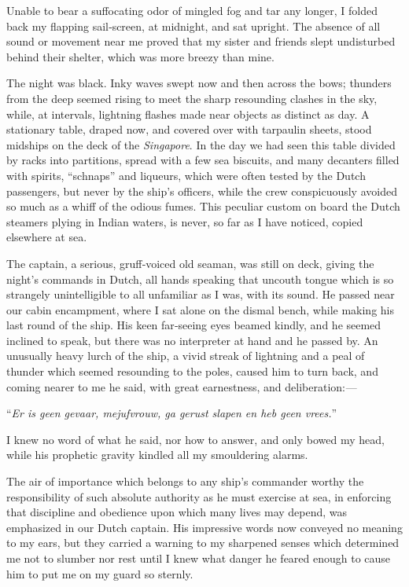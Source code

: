 \documentclass[12pt]{book}
\begin{document}
Unable to bear a suffocating odor of mingled fog and tar any longer, I folded
back my flapping sail‐screen, at midnight, and sat upright. The absence of all
sound or movement near me proved that my sister and friends slept undisturbed
behind their shelter, which was more breezy than mine.

The night was black. Inky waves swept now and then across the bows;
thunders from the deep seemed rising to meet the sharp resounding clashes in
the sky, while, at intervals, lightning flashes made near objects as distinct as day.
A stationary table, draped now, and covered over with tarpaulin sheets, stood
midships on the deck of the {\it Singapore}. In the day we had seen this table divided by
racks into partitions, spread with a few sea biscuits, and many decanters filled with
spirits, “schnaps” and liqueurs, which were often tested by the Dutch passengers,
but never by the ship’s officers, while the crew conspicuously avoided so much as
a whiff of the odious fumes. This peculiar custom on board the Dutch steamers
plying in Indian waters, is never, so far as I have noticed, copied elsewhere at sea.

The captain, a serious, gruff‐voiced old seaman, was still on deck, giving the
night’s commands in Dutch, all hands speaking that uncouth tongue which is so
strangely unintelligible to all unfamiliar as I was, with its sound. He passed near
our cabin encampment, where I sat alone on the dismal bench, while making his
last round of the ship. His keen far‐seeing eyes beamed kindly, and he seemed
inclined to speak, but there was no interpreter at hand and he passed by. An
unusually heavy lurch of the ship, a vivid streak of lightning and a peal of thunder
which seemed resounding to the poles, caused him to turn back, and coming
nearer to me he said, with great earnestness, and deliberation: —

“{\it Er is {\sc geen gevaar}, mejufvrouw, ga gerust slapen en heb {\sc geen vrees}.}”

I knew no word of what he said, nor how to answer, and only bowed my head,
while his prophetic gravity kindled all my smouldering alarms.

The air of importance which belongs to any ship’s commander worthy the
responsibility of such absolute authority as he must exercise at sea, in enforcing
that discipline and obedience upon which many lives may depend, was emphasized
in our Dutch captain. His impressive words now conveyed no meaning to my
ears, but they carried a warning to my sharpened senses which determined me
not to slumber nor rest until I knew what danger he feared enough to cause him
to put me on my guard so sternly.
\end{document}
